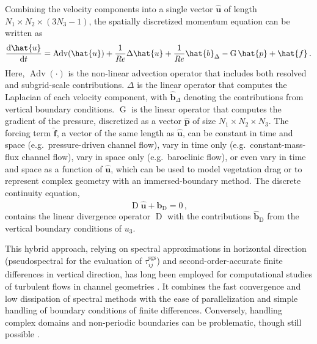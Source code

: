 \documentclass[gmd, manuscript]{copernicus}
\begin{document}
Combining the velocity components into a single vector \(\boldsymbol{\hat{u}}\) of length \(N_1 \times N_2 \times (3 N_3 - 1)\), the spatially discretized momentum equation can be written as
\begin{equation}
  \frac{\mathrm{d}\boldsymbol{\hat{u}}}{\mathrm{d}t} = \operatorname{Adv}(\boldsymbol{\hat{u}}) + \frac{1}{R \mkern -.2mue} \Delta \boldsymbol{\hat{u}} + \frac{1}{R \mkern -.2mue} \boldsymbol{\hat{b}}_\Delta - \operatorname{G} \boldsymbol{\hat{p}} + \boldsymbol{\hat{f}}
  \,.
  \label{eq:mom-vec}
\end{equation}
Here, \(\operatorname{Adv}(\cdot)\) is the non-linear advection operator that includes both resolved and subgrid-scale contributions.
\(\Delta\) is the linear operator that computes the Laplacian of each velocity component, with \(\boldsymbol{\hat{b}}_\Delta\) denoting the contributions from vertical boundary conditions.
\(\operatorname{G}\) is the linear operator that computes the gradient of the pressure, discretized as a vector \(\boldsymbol{\hat{p}}\) of size \(N_1 \times N_2 \times N_3\).
The forcing term \(\boldsymbol{\hat{f}}\), a vector of the same length as \(\boldsymbol{\hat{u}}\), can be constant in time and space (e.g.~pressure-driven channel flow), vary in time only (e.g.~constant-mass-flux channel flow), vary in space only (e.g.~baroclinic flow), or even vary in time and space as a function of \(\boldsymbol{\hat{u}}\), which can be used to model vegetation drag or to represent complex geometry with an immersed-boundary method.
The discrete continuity equation,
\begin{equation}
  \operatorname{D} \boldsymbol{\hat{u}} + \boldsymbol{\hat{b}}_\mathrm{D} = 0
  \,,
  \label{eq:cont-vec}
\end{equation}
contains the linear divergence operator \(\operatorname{D}\) with the contributions \(\boldsymbol{\hat{b}}_\mathrm{D}\) from the vertical boundary conditions of \(u_3\).

This hybrid approach, relying on spectral approximations in horizontal direction (pseudospectral for the evaluation of \(\tau_{ij}^\mathrm{sgs}\)) and second-order-accurate finite differences in vertical direction, has long been employed for computational studies of turbulent flows in channel geometries \citep{MoinKim1982, Moeng1984, AlbertsonParlange1999a, AlbertsonParlange1999b}.
It combines the fast convergence and low dissipation of spectral methods \citep{GiacominiGiometto2021} with the ease of parallelization and simple handling of boundary conditions of finite differences.
Conversely, handling complex domains and non-periodic boundaries can be problematic, though still possible \citep{ChesterMeneveauParlange2007, Schmid2015, LiBouZeidAnderson2016}.
\end{document}

